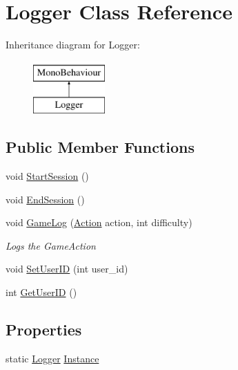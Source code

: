 \hypertarget{classLogger}{}\section{Logger Class Reference}
\label{classLogger}
Inheritance diagram for Logger\+:\begin{figure}[H]
\begin{center}
\leavevmode
\includegraphics[height=2.000000cm]{classLogger}
\end{center}
\end{figure}
\subsection*{Public Member Functions}
\begin{DoxyCompactItemize}
\item 
void \hyperlink{classLogger_acd303e3c8e144e2c272756667bb2bb7f}{Start\+Session} ()
\item 
void \hyperlink{classLogger_a132993921b28aba513c2269245ac524e}{End\+Session} ()
\item 
void \hyperlink{classLogger_a98d17dc5b719d710cec46f6b05aa2de3}{Game\+Log} (\hyperlink{LogActions_8cs_a8bb1ef53467e4f61410d12822d922498}{Action} action, int difficulty)
\begin{DoxyCompactList}\small\item\em Logs the Game\+Action \end{DoxyCompactList}\item 
void \hyperlink{classLogger_aaea5a90b12fb6f526f469ea5333b51db}{Set\+User\+ID} (int user\+\_\+id)
\item 
int \hyperlink{classLogger_a40bd581a38e52d1c5a80c863799e9d48}{Get\+User\+ID} ()
\end{DoxyCompactItemize}
\subsection*{Properties}
\begin{DoxyCompactItemize}
\item 
static \hyperlink{classLogger}{Logger} \hyperlink{classLogger_a5ac0e0c61a5b13190e8d3d7113416954}{Instance}
\end{DoxyCompactItemize}


